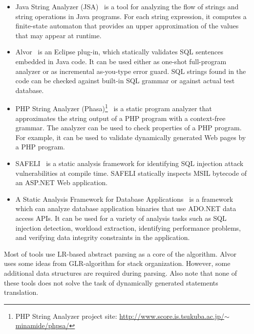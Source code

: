 \documentclass{acm_proc_article-sp}
\begin{document}
\begin{itemize}
\item Java String Analyzer (JSA)~\cite{JSAArticle} is a tool for analyzing the flow of strings and string operations in Java programs. For each string expression, it computes a finite-state automaton that provides an upper approximation of the values that may appear at runtime.

\item  Alvor~\cite{Annamaa:2010:ITA:1947873.1947886}  is an Eclipse plug-in, which statically validates SQL sentences embedded in Java code. It can be used either as one-shot full-program analyzer or as incremental as-you-type error guard. SQL strings found in the code can be checked against built-in SQL grammar or against actual test database.

\item  PHP String Analyzer (Phasa)\footnote{PHP String Analyzer project site: \href{http://www.score.is.tsukuba.ac.jp/~minamide/phpsa/}{http://www.score.is.tsukuba.ac.jp/$\sim$minamide/phpsa/}}~\cite{Minamide:2005:SAD:1060745.1060809}  is a static program analyzer that approximates the string output of a PHP program with a context-free grammar. The analyzer can be used to check properties of a PHP program. For example, it can be used to validate dynamically generated Web pages by a PHP program.

\item SAFELI~\cite{Fu:2007:SAF:1299135.1299784} is a static analysis framework for identifying SQL injection attack vulnerabilities at compile time. SAFELI statically inspects MSIL bytecode of an ASP.NET Web application.

\item A Static Analysis Framework for Database Applications~\cite{Dasgupta:2009:SAF:1546683.1547548} is a framework which can analyze database  application binaries that use ADO.NET data access APIs. It can be used for a variety of analysis tasks such as SQL injection detection, workload extraction, identifying performance problems, and verifying data integrity constraints in the application. 
\end{itemize}

Most of tools use LR-based abstract parsing as a core of the algorithm. Alvor uses some ideas from GLR-algorithm for stack organization. However, some additional data structures are required during parsing.  Also note that none of these tools does not solve the task of dynamically generated statements translation.
\end{document}
